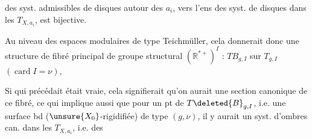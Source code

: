 des syst. admissibles de disques  autour
des $a_i$, vers l'ens des syst.
de disques  dans les $T_{X,a_i}$,
est bijective. 

Au niveau des espaces
modulaires de type Teichmüller,
cela donnerait donc une  structure
de fibré principal de groupe
structural $(\mathbb R^{*+})^I$ : $TB_{g,I}$
sur $T_{g,I}$ $(\operatorname{card}I=\nu)$, \deleted{\unsure{--}}

Si  qui précédait
 était vraie, cela signifierait
qu'on aurait une section canonique
de ce fibré, ce qui implique
aussi que pour un pt de $T\deleted{B}_{g,I}$,
i.e. une surface bd  ($\unsure{X_0}$-rigidifiée)
de type $(g,\nu)$, il y aurait un syst.
d'ombres can. dans les $T_{X,a_i}$, i.e. des
